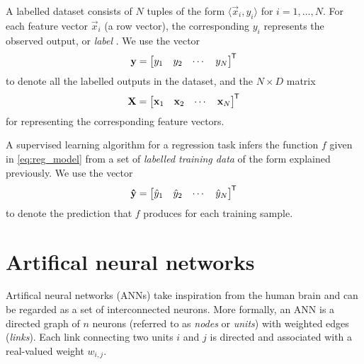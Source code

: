 \begin{definition}
    \label{def:labelled_dataset}
    A labelled dataset consists of $N$ tuples of the form $\langle \vec{x}_i, y_i\rangle$ for $i=1,\dots,N$.
    For each feature vector $\vec{x}_i$ (a row vector), the corresponding $y_i$ represents the observed output, or \textit{label} \cite{burkov2019}.
    We use the vector
    \begin{equation}
        \label{eq:sup_learn_target}
        \mathbf{y} = \begin{bmatrix}
            y_1 & y_2 & \cdots & y_N
        \end{bmatrix}^{\mkern-1.5mu\mathsf{T}}
    \end{equation}
    to denote all the labelled outputs in the dataset, and the $N \times D$ matrix
    \begin{equation}
        \label{eq:sup_learn_input_matrix}
        \mathbf{X} = \begin{bmatrix}
            \mathbf{x}_1 & \mathbf{x}_2 & \cdots & \mathbf{x}_N
        \end{bmatrix}^{\mkern-1.5mu\mathsf{T}}
    \end{equation}
    for representing the corresponding feature vectors.
\end{definition}

\begin{definition}
    \label{def:supervised_learning}
    A supervised learning algorithm for a regression task infers the function $f$ given in \ref{eq:reg_model} from a set of \textit{labelled training data} of the form explained previously. 
    We use the vector
    \begin{equation}
        \label{eq:sup_learn_prediction}
        \mathbf{\hat{y}} = \begin{bmatrix}
            \hat{y}_1 & \hat{y}_2 & \cdots & \hat{y}_N
        \end{bmatrix}^{\mkern-1.5mu\mathsf{T}}
    \end{equation}
    to denote the prediction that $f$ produces for each training sample.
\end{definition}

\section{Artifical neural networks}
\label{sec:ann}
Artifical neural networks (ANNs) take inspiration from the human brain and can be regarded as a set of interconnected neurons. 
More formally, an ANN is a directed graph of $n$ neurons (referred to as \textit{nodes} or \textit{units}) with weighted edges (\textit{links}).
Each link connecting two units $i$ and $j$ is directed and associated with a real-valued weight $w_{i,j}$. 

